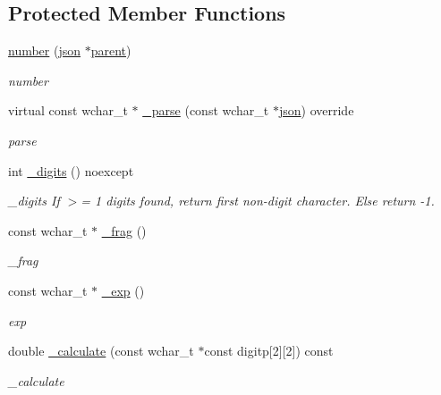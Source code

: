 \subsection*{Protected Member Functions}
\begin{DoxyCompactItemize}
\item 
\hyperlink{classformat_1_1number_a42925fd91530ff2387551786f693d64c}{number} (\hyperlink{classformat_1_1json}{json} $\ast$\hyperlink{classformat_1_1value_a86c03ec8810bfd0d60ec49095120040d}{parent})
\begin{DoxyCompactList}\small\item\em number \end{DoxyCompactList}\item 
virtual const wchar\+\_\+t $\ast$ \hyperlink{classformat_1_1number_a4f6d13dea49376a8fdc9d7fabdca2ae8}{\+\_\+parse} (const wchar\+\_\+t $\ast$\hyperlink{classformat_1_1json}{json}) override
\begin{DoxyCompactList}\small\item\em parse \end{DoxyCompactList}\item 
int \hyperlink{classformat_1_1number_af1494bce577a03f7492df16280d26bb8}{\+\_\+digits} () noexcept
\begin{DoxyCompactList}\small\item\em \+\_\+digits If $>$= 1 digits found, return first non-\/digit character. Else return -\/1. \end{DoxyCompactList}\item 
const wchar\+\_\+t $\ast$ \hyperlink{classformat_1_1number_ae883194a337cd099e2e681020f23f4f7}{\+\_\+frag} ()
\begin{DoxyCompactList}\small\item\em \+\_\+frag \end{DoxyCompactList}\item 
const wchar\+\_\+t $\ast$ \hyperlink{classformat_1_1number_aeef08ddacaa9660d294e2b1ba352b2bc}{\+\_\+exp} ()
\begin{DoxyCompactList}\small\item\em {\itshape exp} \end{DoxyCompactList}\item 
double \hyperlink{classformat_1_1number_a07231914fb9d70ffa8df059d5fe134f3}{\+\_\+calculate} (const wchar\+\_\+t $\ast$const digitp\mbox{[}2\mbox{]}\mbox{[}2\mbox{]}) const 
\begin{DoxyCompactList}\small\item\em \+\_\+calculate \end{DoxyCompactList}\item 

\end{DoxyCompactItemize}
